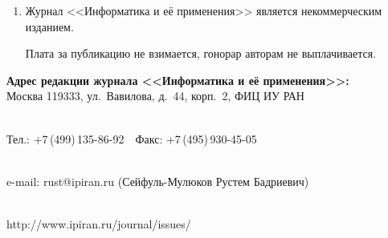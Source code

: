 {\begin{enumerate}[1.]
\begin{itemize}
\item использовать attach (присоединение);\\[-13.5pt]


\item в состав электронной версии статьи должны входить: файл, содержащий текст


статьи, и файл(ы), содержащий(е) иллюстрации.\\[-13.5pt]


\end{itemize}





\item Журнал <<Информатика и её применения>> является некоммерческим изданием.


Плата за публикацию не взимается, гонорар авторам не выплачивается.


\end{enumerate}





 \thispagestyle{empty}







\begin{center}





\textbf{Адрес редакции журнала <<Информатика и её применения>>:} \\














Москва 119333, ул.~Вавилова, д.~44, корп.~2, ФИЦ ИУ РАН\\[-10pt]





\





Тел.: +7\,(499)\,135-86-92\ \ Факс:  +7\,(495)\,930-45-05\\[-10pt]





 \





e-mail:   {\sf rust@ipiran.ru} (Сейфуль-Мулюков Рустем Бадриевич)\\[-10pt]





\





{\sf http://www.ipiran.ru/journal/issues/}


\end{center}


}


